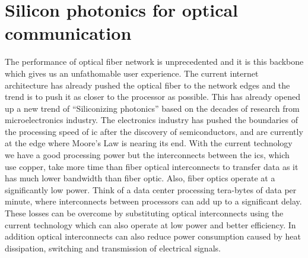 \documentclass[../report.tex]{subfiles}
\begin{document}
	\section{Silicon photonics for optical communication}
The performance of optical fiber network is unprecedented and it is this backbone which gives us an unfathomable user experience. The current internet architecture has already pushed the optical fiber to the network edges and the trend is to push it as closer to the processor as possible. This has already opened up a new trend of “Siliconizing photonics” based on the decades of research from microelectronics industry. The electronics industry has pushed the boundaries of the processing speed of \gls{ic} after the discovery of semiconductors, and are currently at the edge where Moore’s Law is nearing its end. With the current technology we have a good processing power but the interconnects between the \gls{ic}s, which use copper, take more time than fiber optical interconnects to transfer data as it has much lower bandwidth than fiber optic. Also, fiber optics operate at a significantly low power. Think of a data center processing tera-bytes of data per minute, where interconnects between processors can add up to a significant delay. These losses can be overcome by substituting optical interconnects using the current technology which can also operate at low power and better efficiency. In addition optical interconnects can also reduce power consumption caused by heat dissipation, switching and transmission of electrical signals.\par
\end{document}

